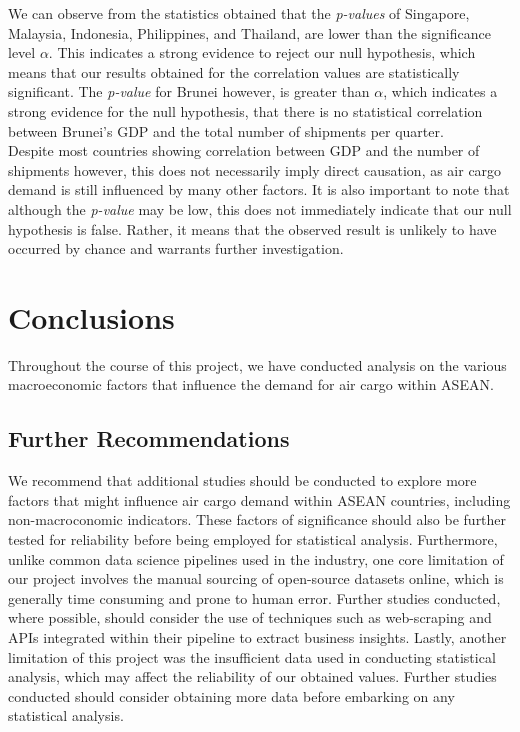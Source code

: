\documentclass{article}
\begin{document}
\noindent We can observe from the statistics obtained that the \textit{p-values} of Singapore, Malaysia, Indonesia, Philippines, and Thailand, are lower than the significance level $\alpha$. This indicates a strong evidence to reject our null hypothesis, which means that our results obtained for the correlation values are statistically significant. The \textit{p-value} for Brunei however, is greater than $\alpha$, which indicates a strong evidence for the null hypothesis, that there is no statistical correlation between Brunei's GDP and the total number of shipments per quarter. \\

\noindent Despite most countries showing correlation between GDP and the number of shipments however, this does not necessarily imply direct causation, as air cargo demand is still influenced by many other factors. It is also important to note that although the \textit{p-value} may be low, this does not immediately indicate that our null hypothesis is false. Rather, it means that the observed result is unlikely to have occurred by chance and warrants further investigation.

\section{Conclusions}
Throughout the course of this project, we have conducted analysis on the various macroeconomic factors that influence the demand for air cargo within ASEAN.

\subsection{Further Recommendations}
We recommend that additional studies should be conducted to explore more factors that might influence air cargo demand within ASEAN countries, including non-macroconomic indicators. These factors of significance should also be further tested for reliability before being employed for statistical analysis. Furthermore, unlike common data science pipelines used in the industry, one core limitation of our project involves the manual sourcing of open-source datasets online, which is generally time consuming and prone to human error. Further studies conducted, where possible, should consider the use of techniques such as web-scraping and APIs integrated within their pipeline to extract business insights. Lastly, another limitation of this project was the insufficient data used in conducting statistical analysis, which may affect the reliability of our obtained values. Further studies conducted should consider obtaining more data before embarking on any statistical analysis. 
\end{document}
